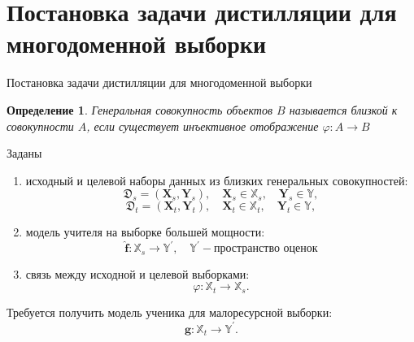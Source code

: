 \documentclass[10pt,pdf,hyperref={unicode}]{beamer}
\newtheorem{rusdefinition}{Определение}
\begin{document}
\section{Постановка задачи дистилляции для многодоменной выборки}
\begin{frame}{Постановка задачи дистилляции для многодоменной выборки}

\begin{rusdefinition}
Генеральная совокупность объектов $B$ называется близкой к совокупности $A$, если существует инъективное отображение $\varphi: A \rightarrow B$
\end{rusdefinition}

Заданы
\begin{enumerate}[1)]
    \item исходный и целевой наборы данных из близких генеральных совокупностей:
    $$\mathfrak{D}_{s}=(\mathbf{X}_{s},\mathbf{Y}_{s}),
    \quad \mathbf{X}_{s} \in \mathbb{X}_{s},
    \quad \mathbf{Y}_{s} \in \mathbb{Y},$$
    $$\mathfrak{D}_{t}=(\mathbf{X}_{t},\mathbf{Y}_{t}),
    \quad \mathbf{X}_{t} \in \mathbb{X}_{t},
    \quad \mathbf{Y}_{t} \in \mathbb{Y},$$
    
    \item модель учителя на выборке большей мощности:
    $$\hat{\mathbf{f}}: \mathbb{X}_{s} \rightarrow \mathbb{Y}^{\prime}, \quad \mathbb{Y}^{\prime} - \text{пространство оценок}$$
    
    \item связь между исходной и целевой выборками:
    $$\varphi: \mathbb{X}_{t} \rightarrow \mathbb{X}_{s}.$$
\end{enumerate}

Требуется получить модель ученика для малоресурсной выборки:
$$\mathbf{g}: \mathbb{X}_{t} \rightarrow \mathbb{Y}^{\prime}.$$

\end{frame}

\end{document}
